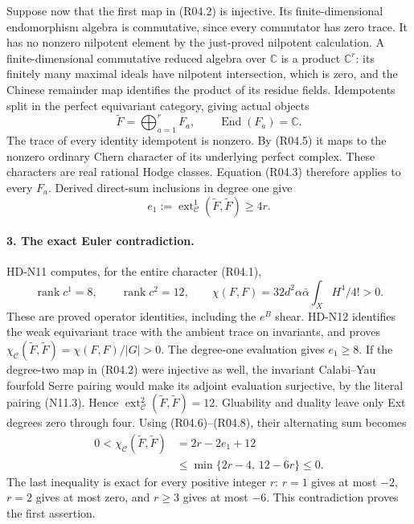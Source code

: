 Suppose now that the first map in (R04.2) is injective. Its
finite-dimensional endomorphism algebra is commutative, since every
commutator has zero trace. It has no nonzero nilpotent element by the
just-proved nilpotent calculation. A finite-dimensional commutative
reduced algebra over $\mathbb C$ is a product $\mathbb C^r$:
its finitely many maximal ideals have nilpotent intersection, which
is zero, and the Chinese remainder map identifies the product of
its residue fields. Idempotents split in the perfect equivariant
category, giving actual objects
\[
       \widetilde F=\bigoplus_{a=1}^rF_a,
       \qquad \operatorname{End}(F_a)=\mathbb C.                 \tag{R04.6}
\]
The trace of every identity idempotent is nonzero. By (R04.5) it
maps to the nonzero ordinary Chern character of its underlying
perfect complex. These characters are real rational Hodge classes.
Equation (R04.3) therefore applies to every $F_a$. Derived direct-sum
inclusions in degree one give
\[
        e_1:=\operatorname{ext}^1_{\mathcal C}
                       (\widetilde F,\widetilde F)\ge4r.        \tag{R04.7}
\]

\paragraph{3. The exact Euler contradiction.}
HD-N11 computes, for the entire character (R04.1),
\[
       \operatorname{rank}c^1=8,\qquad
       \operatorname{rank}c^2=12,\qquad
       \chi(F,F)=32d^2\alpha\bar\alpha\int_X H^4/4!>0.
                                                               \tag{R04.8}
\]
These are proved operator identities, including the $e^B$ shear.
HD-N12 identifies the weak equivariant trace with the ambient trace
on invariants, and proves
$\chi_{\mathcal C}(\widetilde F,\widetilde F)=\chi(F,F)/|G|>0$.
The degree-one evaluation gives $e_1\ge8$.
If the degree-two map in (R04.2) were injective as well, the invariant
Calabi--Yau fourfold Serre pairing would make its adjoint evaluation
surjective, by the literal pairing (N11.3). Hence
$\operatorname{ext}^2_{\mathcal C}(\widetilde F,\widetilde F)=12$.
Gluability and duality leave only Ext degrees zero through four.
Using (R04.6)--(R04.8), their alternating sum becomes
\[
 \begin{split}
 0<\chi_{\mathcal C}(\widetilde F,\widetilde F)
      &=2r-2e_1+12\\
      &\le\min\{2r-4,\,12-6r\}\le0.
 \end{split}                                             \tag{R04.9}
\]
The last inequality is exact for every positive integer $r$:
$r=1$ gives at most $-2$, $r=2$ gives at most zero, and $r\ge3$
gives at most $-6$. This contradiction proves the first assertion.

